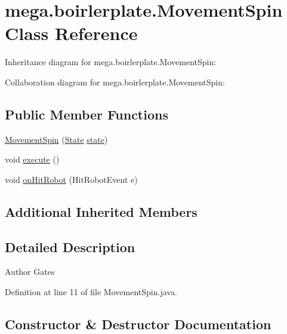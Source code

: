 \hypertarget{classmega_1_1boirlerplate_1_1_movement_spin}{}\section{mega.\+boirlerplate.\+Movement\+Spin Class Reference}
\label{classmega_1_1boirlerplate_1_1_movement_spin}


Inheritance diagram for mega.\+boirlerplate.\+Movement\+Spin\+:


Collaboration diagram for mega.\+boirlerplate.\+Movement\+Spin\+:
\subsection*{Public Member Functions}
\begin{DoxyCompactItemize}
\item 
\hyperlink{classmega_1_1boirlerplate_1_1_movement_spin_ad98ab299d0dcd05c7ffe7062855b856c}{Movement\+Spin} (\hyperlink{classmega_1_1boirlerplate_1_1_state}{State} \hyperlink{classmega_1_1boirlerplate_1_1_component_a87b0d70f323b5fee60a200e07c9c20fd}{state})
\item 
void \hyperlink{classmega_1_1boirlerplate_1_1_movement_spin_a32d7b0998080d0e2a7ab823b65808f2a}{execute} ()
\item 
void \hyperlink{classmega_1_1boirlerplate_1_1_movement_spin_a489cb6a651e4c701588e1d63b4b2fe26}{on\+Hit\+Robot} (Hit\+Robot\+Event e)
\end{DoxyCompactItemize}
\subsection*{Additional Inherited Members}


\subsection{Detailed Description}
\begin{DoxyAuthor}{Author}
Gates 
\end{DoxyAuthor}


Definition at line 11 of file Movement\+Spin.\+java.



\subsection{Constructor \& Destructor Documentation}
\mbox{\label{classmega_1_1boirlerplate_1_1_movement_spin_ad98ab299d0dcd05c7ffe7062855b856c}} 
